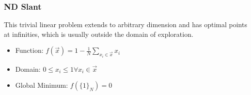 \subsubsection{ND Slant}
This trivial linear problem extends to arbitrary dimension and has optimal points at infinities,
which is usually outside the domain of exploration.
\begin{itemize}
  \item Function: $f(\vec x) = 1 - \frac{1}{N}\sum_{x_i\in \vec x} x_i$
  \item Domain: $0 \leq x_i \leq 1 \forall x_i \in \vec x$
  \item Global Minimum: $f(\{1\}_N) = 0$
\end{itemize}